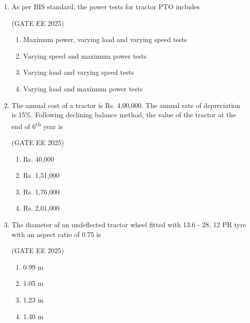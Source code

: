 \documentclass[journal,12pt,onecolumn]{IEEEtran}
\theoremstyle{remark}
\begin{document}
\begin{enumerate}
\hfill(GATE EE 2025)

\begin{multicols}{2}
\begin{enumerate}
\item Counter current gasifier  
\item Co-current gasifier  
\item Cross-draught gasifier  
\item Fluidized bed gasifier  
\end{enumerate}
\end{multicols}

\item As per BIS standard, the power tests for tractor PTO includes 

\hfill(GATE EE 2025)

\begin{enumerate}
\item Maximum power, varying load and varying speed tests  
\item Varying speed and maximum power tests  
\item Varying load and varying speed tests  
\item Varying load and maximum power tests  
\end{enumerate}

\item The annual cost of a tractor is Rs. 4,00,000. The annual rate of depreciation is 15\%. Following declining balance method, the value of the tractor at the end of 6\textsuperscript{th} year is 

\hfill(GATE EE 2025)

\begin{multicols}{4}
\begin{enumerate}
\item Rs. 40,000  
\item Rs. 1,51,000  
\item Rs. 1,76,000  
\item Rs. 2,01,000  
\end{enumerate}
\end{multicols}

\item The diameter of an undeflected tractor wheel fitted with 13.6 - 28, 12 PR tyre with an aspect ratio of 0.75 is  

\hfill(GATE EE 2025)

\begin{multicols}{4}
\begin{enumerate}
\item 0.99 m  
\item 1.05 m  
\item 1.23 m  
\item 1.40 m  
\end{enumerate}
\end{multicols}


\end{enumerate}
\end{document}
